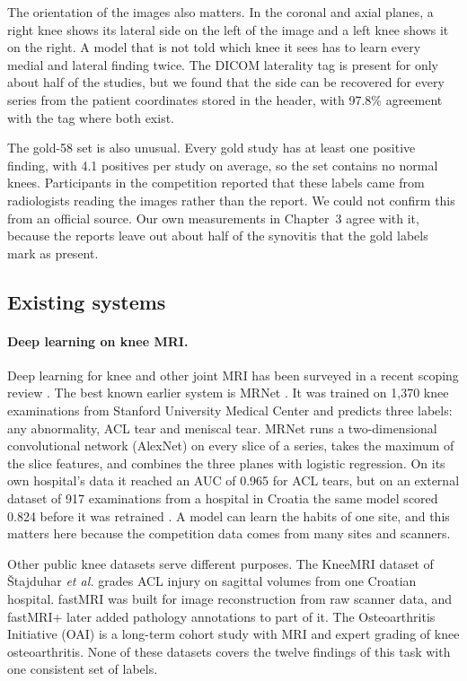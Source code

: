 The orientation of the images also matters. In the coronal and axial planes, a right knee shows its lateral side on the left of the image and a left knee shows it on the right. A model that is not told which knee it sees has to learn every medial and lateral finding twice. The DICOM laterality tag is present for only about half of the studies, but we found that the side can be recovered for every series from the patient coordinates stored in the header, with 97.8\% agreement with the tag where both exist.

The gold-58 set is also unusual. Every gold study has at least one positive finding, with 4.1 positives per study on average, so the set contains no normal knees. Participants in the competition reported that these labels came from radiologists reading the images rather than the report. We could not confirm this from an official source. Our own measurements in Chapter~3 agree with it, because the reports leave out about half of the synovitis that the gold labels mark as present.

\subsection{Existing systems}

\paragraph{Deep learning on knee MRI.} Deep learning for knee and other joint MRI has been surveyed in a recent scoping review \cite{fritz2022review}. The best known earlier system is MRNet \cite{bien2018}. It was trained on 1,370 knee examinations from Stanford University Medical Center and predicts three labels: any abnormality, ACL tear and meniscal tear. MRNet runs a two-dimensional convolutional network (AlexNet) on every slice of a series, takes the maximum of the slice features, and combines the three planes with logistic regression. On its own hospital's data it reached an AUC of 0.965 for ACL tears, but on an external dataset of 917 examinations from a hospital in Croatia the same model scored 0.824 before it was retrained \cite{bien2018,stajduhar2017}. A model can learn the habits of one site, and this matters here because the competition data comes from many sites and scanners.

Other public knee datasets serve different purposes. The KneeMRI dataset of {\v S}tajduhar \emph{et al.} \cite{stajduhar2017} grades ACL injury on sagittal volumes from one Croatian hospital. fastMRI \cite{zbontar2018fastmri} was built for image reconstruction from raw scanner data, and fastMRI+ \cite{zhao2022fastmriplus} later added pathology annotations to part of it. The Osteoarthritis Initiative (OAI) \cite{nevitt_oai} is a long-term cohort study with MRI and expert grading of knee osteoarthritis. None of these datasets covers the twelve findings of this task with one consistent set of labels.

